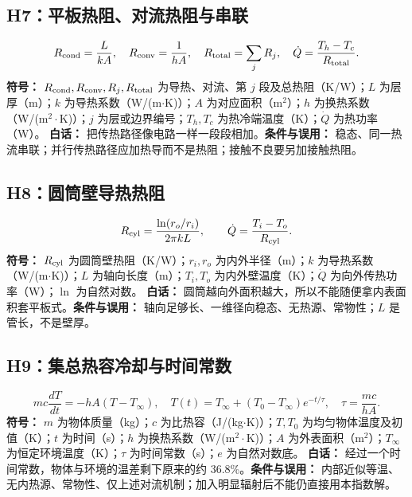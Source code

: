 \subsection{H7：平板热阻、对流热阻与串联}
\begin{equation}
R_{\rm cond}=\frac{L}{kA},\quad R_{\rm conv}=\frac1{hA},\quad R_{\rm total}=\sum_jR_j,\quad \dot Q=\frac{T_h-T_c}{R_{\rm total}}.
\end{equation}
\textbf{符号：} $R_{\rm cond},R_{\rm conv},R_j,R_{\rm total}$ 为导热、对流、第 $j$ 段及总热阻（K/W）；$L$ 为层厚（m）；$k$ 为导热系数（W/(m$\cdot$K)）；$A$ 为对应面积（m$^2$）；$h$ 为换热系数（W/(m$^2\cdot$K)）；$j$ 为层或边界编号；$T_h,T_c$ 为热冷端温度（K）；$\dot Q$ 为热功率（W）。
\textbf{白话：} 把传热路径像电路一样一段段相加。\textbf{条件与误用：} 稳态、同一热流串联；并行传热路径应加热导而不是热阻；接触不良要另加接触热阻。

\subsection{H8：圆筒壁导热热阻}
\begin{equation}
R_{\rm cyl}=\frac{\ln(r_o/r_i)}{2\pi kL},\qquad \dot Q=\frac{T_i-T_o}{R_{\rm cyl}}.
\end{equation}
\textbf{符号：} $R_{\rm cyl}$ 为圆筒壁热阻（K/W）；$r_i,r_o$ 为内外半径（m）；$k$ 为导热系数（W/(m$\cdot$K)）；$L$ 为轴向长度（m）；$T_i,T_o$ 为内外壁温度（K）；$\dot Q$ 为向外传热功率（W）；$\ln$ 为自然对数。
\textbf{白话：} 圆筒越向外面积越大，所以不能随便拿内表面积套平板式。\textbf{条件与误用：} 轴向足够长、一维径向稳态、无热源、常物性；$L$ 是管长，不是壁厚。

\subsection{H9：集总热容冷却与时间常数}
\begin{equation}
mc\frac{dT}{dt}=-hA(T-T_\infty),\quad T(t)=T_\infty+(T_0-T_\infty)e^{-t/\tau},\quad \tau=\frac{mc}{hA}.
\end{equation}
\textbf{符号：} $m$ 为物体质量（kg）；$c$ 为比热容（J/(kg$\cdot$K)）；$T,T_0$ 为均匀物体温度及初值（K）；$t$ 为时间（s）；$h$ 为换热系数（W/(m$^2\cdot$K)）；$A$ 为外表面积（m$^2$）；$T_\infty$ 为恒定环境温度（K）；$\tau$ 为时间常数（s）；$e$ 为自然对数底。
\textbf{白话：} 经过一个时间常数，物体与环境的温差剩下原来的约 36.8\%。\textbf{条件与误用：} 内部近似等温、无内热源、常物性、仅上述对流机制；加入明显辐射后不能仍直接用本指数解。

